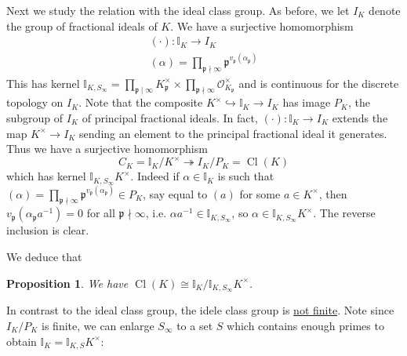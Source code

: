 \documentclass[11pt]{article}
\theoremstyle{definition}
\theoremstyle{plain}
\newtheorem{proposition}[definition]{Proposition}
\theoremstyle{remark}
\DeclareMathOperator{\Cl}{Cl}
\newcommand{\II}{\mathbb{I}}
\newcommand{\cO}{\mathcal{O}}
\newcommand{\fp}{\mathfrak{p}}
\begin{document}
Next we study the relation with the ideal class group. As before, we let $I_K$ denote the group of fractional ideals of $K$. We have a surjective homomorphism
\begin{gather*}
    (\cdot) : \II_K \to I_K\\
    (\alpha) = \prod_{\fp \nmid \infty} \fp^{v_\fp(\alpha_\fp)}
\end{gather*}
This has kernel $\II_{K, S_\infty} = \prod_{\fp \mid \infty} K_\fp^\times \times \prod_{\fp \nmid \infty} \cO_{K_\fp}^\times$ and is continuous for the discrete topology on $I_K$. Note that the composite $K^\times \hookrightarrow \II_K \to I_K$ has image $P_K$, the subgroup of $I_K$ of principal fractional ideals. {\color{blue} In fact, $(\cdot) : \II_K \to I_K$ extends the map $K^\times \to I_K$ sending an element to the principal fractional ideal it generates.} Thus we have a surjective homomorphism
\begin{equation*}
    C_K = \II_K / K^\times \twoheadrightarrow I_K / P_K = \Cl(K)
\end{equation*}
which has kernel $\II_{K, S_\infty} K^\times$. {\color{blue} Indeed if $\alpha \in \II_K$ is such that $(\alpha) = \prod_{\fp \nmid \infty} \fp^{v_\fp(\alpha_\fp)} \in P_K$, say equal to $(a)$ for some $a \in K^\times$, then $v_\fp(\alpha_\fp a^{-1}) = 0$ for all $\fp \nmid \infty$, i.e. $\alpha a^{-1} \in \II_{K, S_\infty}$, so $\alpha \in \II_{K, S_\infty} K^\times$. The reverse inclusion is clear.}

We deduce that

\begin{proposition}\label{prop:9_9}
    We have $\Cl(K) \cong \II_K / \II_{K, S_\infty} K^\times$.
\end{proposition}

In contrast to the ideal class group, the idele class group is \underline{not finite}. Note since $I_K / P_K$ is finite, we can enlarge $S_\infty$ to a set $S$ which contains enough primes to obtain $\II_K = \II_{K,S} K^\times$:
\end{document}
